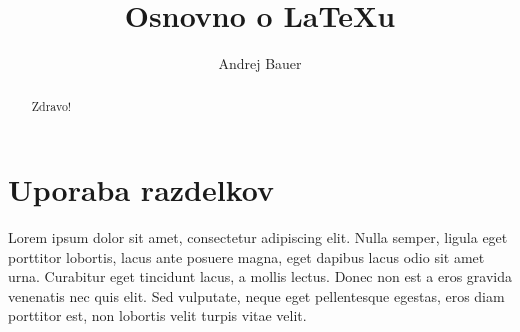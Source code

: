\documentclass[a4paper]{article}
\begin{document}

\title{Osnovno o {\LaTeX}u}
\author{Andrej Bauer}


\maketitle


\begin{abstract}
  Zdravo!
\end{abstract}


\section{Uporaba razdelkov}


Lorem ipsum dolor sit amet, consectetur adipiscing elit. Nulla semper, ligula eget
porttitor lobortis, lacus ante posuere magna, eget dapibus lacus odio sit amet urna.
Curabitur eget tincidunt lacus, a mollis lectus. Donec non est a eros gravida venenatis
nec quis elit. Sed vulputate, neque eget pellentesque egestas, eros diam porttitor est,
non lobortis velit turpis vitae velit.
\end{document}
